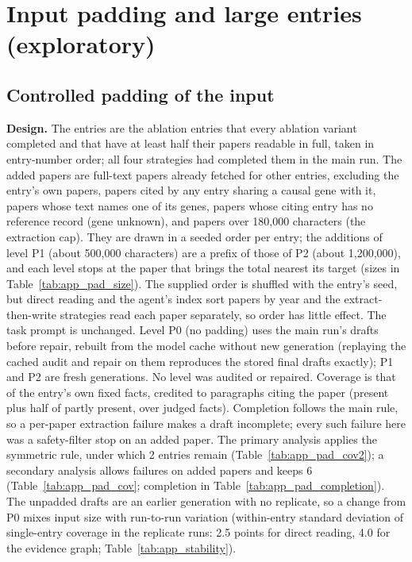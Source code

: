 \documentclass{article} %
\begin{document}
\FloatBarrier
\FloatBarrier
\section{Input padding and large entries (exploratory)}
\label{app:padding}
\subsection{Controlled padding of the input}
\textbf{Design.} The entries are the ablation entries that every ablation variant completed and that have at least half their papers readable in full, taken in entry-number order; all four strategies had completed them in the main run. The added papers are full-text papers already fetched for other entries, excluding the entry's own papers, papers cited by any entry sharing a causal gene with it, papers whose text names one of its genes, papers whose citing entry has no reference record (gene unknown), and papers over 180,000 characters (the extraction cap). They are drawn in a seeded order per entry; the additions of level P1 (about 500,000 characters) are a prefix of those of P2 (about 1,200,000), and each level stops at the paper that brings the total nearest its target (sizes in Table~\ref{tab:app_pad_size}). The supplied order is shuffled with the entry's seed, but direct reading and the agent's index sort papers by year and the extract-then-write strategies read each paper separately, so order has little effect. The task prompt is unchanged. Level P0 (no padding) uses the main run's drafts before repair, rebuilt from the model cache without new generation (replaying the cached audit and repair on them reproduces the stored final drafts exactly); P1 and P2 are fresh generations. No level was audited or repaired. Coverage is that of the entry's own fixed facts, credited to paragraphs citing the paper (present plus half of partly present, over judged facts). Completion follows the main rule, so a per-paper extraction failure makes a draft incomplete; every such failure here was a safety-filter stop on an added paper. The primary analysis applies the symmetric rule, under which 2 entries remain (Table~\ref{tab:app_pad_cov2}); a secondary analysis allows failures on added papers and keeps 6 (Table~\ref{tab:app_pad_cov}; completion in Table~\ref{tab:app_pad_completion}). The unpadded drafts are an earlier generation with no replicate, so a change from P0 mixes input size with run-to-run variation (within-entry standard deviation of single-entry coverage in the replicate runs: 2.5 points for direct reading, 4.0 for the evidence graph; Table~\ref{tab:app_stability}).
\end{document}
